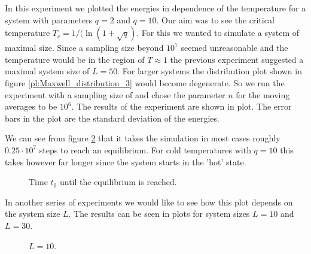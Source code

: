 In this experiment we plotted the energies in dependence of the temperature for a system with parameters $q=2$ and $q=10$. Our aim was to see the critical temperature $T_c=1/(\ln(1+\sqrt{q})$. For this we wanted to simulate a system of maximal size. Since a sampling size beyond $10^7$ seemed unreasonable and the temperature would be in the region of $T\approx1$ the previous experiment suggested a maximal system size of $L=50$. For larger systems the distribution plot shown in figure \ref{pl:Maxwell_distribution_3} would become degenerate.
So we run the experiment with a sampling size of  and chose the parameter $n$ for the moving averages to be $10^6$. The results of the experiment are shown in plot. The error bars in the plot are the standard deviation of the energies.

\begin{figure}
\centering
\begin{minipage}{0.7\textwidth}
\centering
\graphicspath{{../../Plots/}}

\caption{}
\label{fi:energies_T_q_L50}
\end{minipage}
\end{figure}

We can see from figure \ref{fi:t0_T_q_L50} that it takes the simulation in most cases roughly $0.25\cdot 10^7$ steps to reach an equilibrium. For cold temperatures with $q=10$ this takes however far longer since the system starts in the 'hot' state.

\begin{figure}
\centering
\begin{minipage}{0.7\textwidth}
\centering
\graphicspath{{../../Plots/}}

\caption{Time $t_0$ until the equilibrium is reached.}
\label{fi:t0_T_q_L50}
\end{minipage}
\end{figure}

In another series of experiments we would like to see how this plot depends on the system size $L$. The results can be seen in plots for system sizes $L=10$ and $L=30$.

\begin{figure}
\centering
\begin{minipage}{0.7\textwidth}
\centering
\graphicspath{{../../Plots/}}

\caption{$L=10$.}
\label{fi:energies_T_q_L50}
\end{minipage}
\end{figure}

